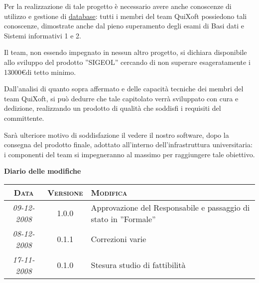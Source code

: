 \documentclass[11pt,a4paper]{article}
\newcommand{\modifiche} 
{
\newpage
\begin{center}
\textbf{Diario delle modifiche} \\
\bigskip
\begin{tabular}{|c|c|p{0.62\textwidth}|}
\hline
\textsc{Data} & \textsc{Versione} & \textsc{Modifica} \\
\hline
\hline
\textit{09-12-2008} & 1.0.0 & Approvazione del Responsabile e passaggio di stato in ''Formale''\\
\hline
\textit{08-12-2008} & 0.1.1 & Correzioni varie  \\
\hline
\textit{17-11-2008} & 0.1.0 & Stesura studio di fattibilità \\
\hline
\end{tabular}
\end{center}
}
\begin{document}
Per la realizzazione di tale progetto è necessario avere anche conoscenze di utilizzo e gestione di \underline{database}: tutti i membri del team QuiXoft possiedono tali conoscenze, dimostrate anche dal pieno superamento degli esami di Basi dati e Sistemi informativi 1 e 2.

Il team, non essendo impegnato in nessun altro progetto, si dichiara disponibile allo sviluppo del prodotto ''SIGEOL'' cercando di non superare esageratamente i 13000\euro \space di tetto minimo.

Dall'analisi di quanto sopra affermato e delle capacità tecniche dei membri del team QuiXoft, si può dedurre che tale capitolato verrà sviluppato con cura e dedizione, realizzando un prodotto di qualità che soddisfi i requisiti del committente.

Sarà ulteriore motivo di soddisfazione il vedere il nostro software, dopo la consegna del prodotto finale, adottato all'interno dell'infrastruttura universitaria: i componenti  del team si impegneranno al massimo per raggiungere tale obiettivo.
\modifiche
\end{document}
